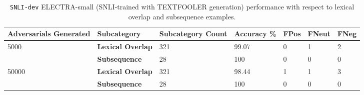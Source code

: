 \documentclass[11pt,a4paper]{article}
\begin{document}
\begin{table}[hbt!]
\begin{center}
\tiny
\begin{tabular}
{p{} p{}|p{} p{} p{} p{} p{} }
  \textbf{Adversarials Generated} & {\tiny \textbf{Subcategory}} & {\tiny \textbf{Subcategory} \textbf{Count}} & {\tiny \textbf{Accuracy} {\%}} & {\tiny \textbf{FPos}} & {\tiny \textbf{FNeut}} & {\tiny \textbf{FNeg}} \\
  \hline
  \multirow{2}{*}{5000} & {\tiny \textbf{Lexical Overlap}} & {\tiny 321} & {\tiny 99.07} & {\tiny 0} & {\tiny 1} & {\tiny 2} \\
  & {\tiny \textbf{Subsequence}} & {\tiny 28} & {\tiny 100} & {\tiny 0} & {\tiny 0} & {\tiny 0} \\
  \hline
  \multirow{2}{*}{50000} & {\tiny \textbf{Lexical Overlap}} & {\tiny 321} & {\tiny 98.44} & {\tiny 1} & {\tiny 1} & {\tiny 3} \\
  & {\tiny \textbf{Subsequence}} & {\tiny 28} & {\tiny 100} & {\tiny 0} & {\tiny 0} & {\tiny 0} \\
\end{tabular}
\end{center}
\caption{\texttt{SNLI-dev} ELECTRA-small (SNLI-trained with TEXTFOOLER generation) performance with respect to lexical overlap and subsequence examples.}
\end{table}
\end{document}
